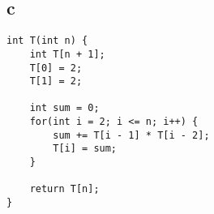 \documentclass[letterpaper,notitlepage,twoside]{article}
\begin{document}
\subsection*{c}
\begin{verbatim}
int T(int n) {
    int T[n + 1];
    T[0] = 2;
    T[1] = 2;
    
    int sum = 0;
    for(int i = 2; i <= n; i++) {
        sum += T[i - 1] * T[i - 2];
        T[i] = sum;
    }
    
    return T[n];
}
\end{verbatim}
\end{document}

